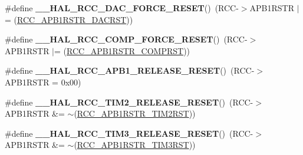 \begin{DoxyCompactItemize}
\item 
\hypertarget{group___r_c_c___a_p_b1___force___release___reset_gad8ea14ca039a7298fecf64b829dc6384}{\#define {\bfseries \-\_\-\-\_\-\-H\-A\-L\-\_\-\-R\-C\-C\-\_\-\-D\-A\-C\-\_\-\-F\-O\-R\-C\-E\-\_\-\-R\-E\-S\-E\-T}()~(R\-C\-C-\/$>$A\-P\-B1\-R\-S\-T\-R $\vert$= (\hyperlink{group___peripheral___registers___bits___definition_ga7fb9c125237cfe5b6436ca795e7f3564}{R\-C\-C\-\_\-\-A\-P\-B1\-R\-S\-T\-R\-\_\-\-D\-A\-C\-R\-S\-T}))}\label{group___r_c_c___a_p_b1___force___release___reset_gad8ea14ca039a7298fecf64b829dc6384}

\item 
\hypertarget{group___r_c_c___a_p_b1___force___release___reset_gaf5d19646b71d320f28600f62991fff49}{\#define {\bfseries \-\_\-\-\_\-\-H\-A\-L\-\_\-\-R\-C\-C\-\_\-\-C\-O\-M\-P\-\_\-\-F\-O\-R\-C\-E\-\_\-\-R\-E\-S\-E\-T}()~(R\-C\-C-\/$>$A\-P\-B1\-R\-S\-T\-R $\vert$= (\hyperlink{group___peripheral___registers___bits___definition_ga8895a90782d329bed4152b0bcf8266f7}{R\-C\-C\-\_\-\-A\-P\-B1\-R\-S\-T\-R\-\_\-\-C\-O\-M\-P\-R\-S\-T}))}\label{group___r_c_c___a_p_b1___force___release___reset_gaf5d19646b71d320f28600f62991fff49}

\item 
\hypertarget{group___r_c_c___a_p_b1___force___release___reset_ga9d0742ab271ace3dbe1a4e83de3d017b}{\#define {\bfseries \-\_\-\-\_\-\-H\-A\-L\-\_\-\-R\-C\-C\-\_\-\-A\-P\-B1\-\_\-\-R\-E\-L\-E\-A\-S\-E\-\_\-\-R\-E\-S\-E\-T}()~(R\-C\-C-\/$>$A\-P\-B1\-R\-S\-T\-R = 0x00)}\label{group___r_c_c___a_p_b1___force___release___reset_ga9d0742ab271ace3dbe1a4e83de3d017b}

\item 
\hypertarget{group___r_c_c___a_p_b1___force___release___reset_ga4b1b3b45c95788edb29ccd2bf6994826}{\#define {\bfseries \-\_\-\-\_\-\-H\-A\-L\-\_\-\-R\-C\-C\-\_\-\-T\-I\-M2\-\_\-\-R\-E\-L\-E\-A\-S\-E\-\_\-\-R\-E\-S\-E\-T}()~(R\-C\-C-\/$>$A\-P\-B1\-R\-S\-T\-R \&= $\sim$(\hyperlink{group___peripheral___registers___bits___definition_ga51ca4659706d0e00333d4abff049dc0d}{R\-C\-C\-\_\-\-A\-P\-B1\-R\-S\-T\-R\-\_\-\-T\-I\-M2\-R\-S\-T}))}\label{group___r_c_c___a_p_b1___force___release___reset_ga4b1b3b45c95788edb29ccd2bf6994826}

\item 
\hypertarget{group___r_c_c___a_p_b1___force___release___reset_ga27cf9c39217fff6ae9bce2285d9aff8c}{\#define {\bfseries \-\_\-\-\_\-\-H\-A\-L\-\_\-\-R\-C\-C\-\_\-\-T\-I\-M3\-\_\-\-R\-E\-L\-E\-A\-S\-E\-\_\-\-R\-E\-S\-E\-T}()~(R\-C\-C-\/$>$A\-P\-B1\-R\-S\-T\-R \&= $\sim$(\hyperlink{group___peripheral___registers___bits___definition_ga8680c562fd372b494a160594525d7ce9}{R\-C\-C\-\_\-\-A\-P\-B1\-R\-S\-T\-R\-\_\-\-T\-I\-M3\-R\-S\-T}))}\label{group___r_c_c___a_p_b1___force___release___reset_ga27cf9c39217fff6ae9bce2285d9aff8c}


\end{DoxyCompactItemize}

